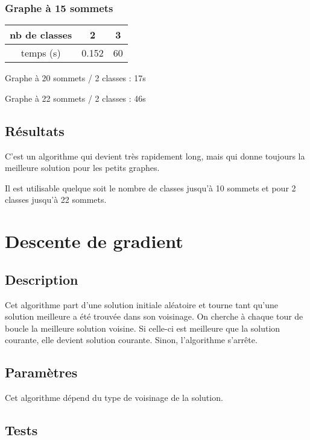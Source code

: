 \documentclass[12pt]{article}
\begin{document}
\subsubsection{Graphe à 15 sommets}

\begin{tabular}{|c|c|c |}
	\hline 
	nb de classes & 2 & 3 \\
	\hline
	temps (s) & 0.152 & 60 \\
	\hline
\end{tabular}

\bigskip
Graphe à 20 sommets / 2 classes : 17s

Graphe à 22 sommets / 2 classes : 46s

\subsection{Résultats}
C'est un algorithme qui devient très rapidement long, mais qui donne toujours la meilleure solution pour les petits graphes.

Il est utilisable quelque soit le nombre de classes jusqu’à 10 sommets et pour 2 classes jusqu’à 22 sommets.

\newpage

\section{Descente de gradient}
\subsection{Description}
Cet algorithme part d’une solution initiale aléatoire et tourne tant qu’une solution meilleure a été trouvée dans son voisinage. On cherche à chaque tour de boucle la meilleure solution voisine. Si celle-ci est meilleure que la solution courante, elle devient solution courante. Sinon, l’algorithme s’arrête.

\subsection{Paramètres}
Cet algorithme dépend du type de voisinage de la solution. 

\subsection{Tests}
\end{document}
